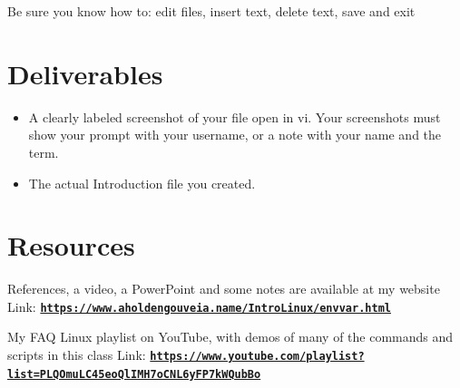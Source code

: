 \documentclass[12pt]{article}
\begin{document}
Be sure you know how to: edit files, insert text, delete text, save and exit




\section*{Deliverables}
\begin{itemize}
    \item A clearly labeled screenshot of your file open in vi. Your screenshots must show your prompt with your username, or a note with your name and the term.
    \item The actual Introduction file you created.
\end{itemize}

\section*{Resources}
References, a video, a PowerPoint and some notes are available at my website
Link: \href{https://www.aholdengouveia.name/IntroLinux/envvar.html}{\textbf{\nolinkurl{https://www.aholdengouveia.name/IntroLinux/envvar.html}}}

My FAQ Linux playlist on YouTube, with demos of many of the commands and scripts in this class
Link: \href{https://www.youtube.com/playlist?list=PLQOmuLC45eoQlIMH7oCNL6yFP7kWQubBo}{\textbf{\nolinkurl{https://www.youtube.com/playlist?list=PLQOmuLC45eoQlIMH7oCNL6yFP7kWQubBo}}}
\end{document}
